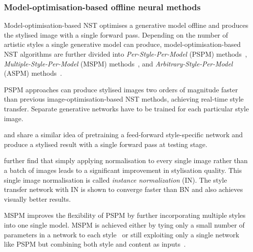 \documentclass{article}
\begin{document}

\subsubsection{Model-optimisation-based offline neural methods}

Model-optimisation-based NST optimises a generative model offline and produces the stylised image with a single forward pass. 
Depending on the number of artistic styles a single generative model can produce,
model-optimisation-based NST algorithms are further divided into 
\textit{Per-Style-Per-Model} (PSPM) methods~\citet{johnson2016perceptual,ulyanov2016texture,ulyanov2017improved,li2016precomputed},
\textit{Multiple-Style-Per-Model} (MSPM) methods~\citep{dumoulin2016learned,Chen_2017_CVPR,li2017diversified,Zhang_2018_ECCV_Workshops}, 
and \textit{Arbitrary-Style-Per-Model} (ASPM) methods~\citep{huang2017arbitrary,chen2016fast,gu2018arbitrary,ghiasi2017exploring,li2017universal}.

PSPM approaches can produce stylised images two orders of magnitude faster than previous image-optimisation-based NST methods, achieving real-time style transfer. Separate generative networks have to be trained for each particular style image.

\citet{johnson2016perceptual} and \citet{ulyanov2016texture} share a similar idea of pretraining a feed-forward style-specific network and produce a stylised result with a single forward pass at testing stage.

\citet{ulyanov2017improved} further find that simply applying normalisation to every single image rather than a batch of images leads to a significant improvement in stylisation quality. This single image normalisation is called \textit{instance normalization} (IN). 
The style transfer network with IN is shown to converge faster than BN and also achieves visually better results.

MSPM improves the flexibility of PSPM by further incorporating multiple styles into one single model. MSPM is achieved either by tying only a small number
of parameters in a network to each style~\citep{dumoulin2016learned,Chen_2017_CVPR} or still exploiting only a single network like PSPM but combining both style and content as inputs~\citep{li2017diversified,Zhang_2018_ECCV_Workshops}.
\end{document}
